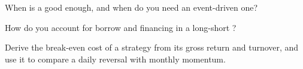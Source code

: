 \begin{interviewq}\label{iq:rs:vectorised-backtests:4}
When is a  good enough, and when do you need an event-driven one?
\end{interviewq}

\begin{interviewq}\label{iq:rs:vectorised-backtests:5}
How do you account for borrow and financing in a long-short ?
\end{interviewq}

\begin{interviewq}\label{iq:rs:vectorised-backtests:6}
Derive the break-even cost of a strategy from its gross return and turnover, and use it to compare a daily reversal with monthly momentum.
\end{interviewq}

